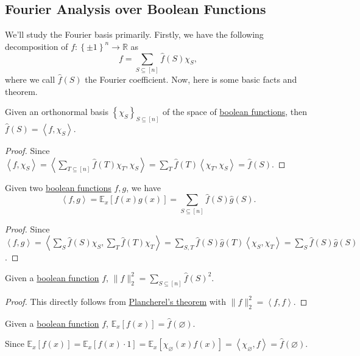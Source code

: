 \subsection{Fourier Analysis over Boolean Functions}
We'll study the Fourier basis primarily. Firstly, we have the following decomposition of \(f\colon \left\{ \pm 1 \right\} ^n \to  \mathbb{R} \) as
\[
	f = \sum_{S \subseteq [n]} \hat{f} (S) \chi _S,
\]
where we call \(\hat{f} (S)\) the Fourier coefficient. Now, here is some basic facts and theorem.

\begin{proposition}
	Given an orthonormal basis \(\left\{ \chi _S \right\}_{S\subseteq [n]} \) of the space of \hyperref[def:boolean-function]{boolean functions}, then \(\hat{f} (S) = \left\langle f, \chi _S \right\rangle \).
\end{proposition}
\begin{proof}
	Since \(\left\langle f, \chi _S \right\rangle
	= \left\langle \sum_{T \subseteq [n]} \hat{f} (T) \chi _T, \chi _S \right\rangle
	= \sum_{T} \hat{f} (T) \left\langle \chi _T, \chi _S \right\rangle
	= \hat{f} (S)\).
\end{proof}

\begin{theorem}\label{thm:Plancherel}
	Given two \hyperref[def:boolean-function]{boolean functions} \(f, g\), we have
	\[
		\left\langle f, g \right\rangle = \mathbb{E}_{x}\left[f(x)g(x) \right] = \sum_{S \subseteq [n]} \hat{f} (S) \hat{g} (S).
	\]
\end{theorem}
\begin{proof}
	Since \(\left\langle f, g \right\rangle
	= \left\langle \sum_{S} \hat{f} (S) \chi _S, \sum_{T} \hat{f} (T) \chi _T \right\rangle
	= \sum_{S, T} \hat{f} (S) \hat{g} (T) \left\langle \chi _S, \chi _T  \right\rangle
	= \sum_S \hat{f}(S)\hat{g}(S)\).
\end{proof}

\begin{theorem}\label{thm:Parseval}
	Given a \hyperref[def:boolean-function]{boolean function} \(f\), \(\lVert f \rVert _2^2 = \sum_{S \subseteq [n]} \hat{f} (S)^2\).
\end{theorem}
\begin{proof}
	This directly follows from \hyperref[thm:Plancherel]{Plancherel's theorem} with \(\lVert f \rVert _2^2 = \left\langle f, f \right\rangle \).
\end{proof}

\begin{claim}
	Given a \hyperref[def:boolean-function]{boolean function} \(f\), \(\mathbb{E}_{x}\left[f(x) \right] = \hat{f} (\varnothing )\).
\end{claim}
\begin{explanation}
	Since \(\mathbb{E}_{x}\left[f(x) \right]
	= \mathbb{E}_{x}\left[f(x) \cdot 1 \right]
	= \mathbb{E}_{x}\left[\chi _\varnothing (x) f(x) \right]
	= \left\langle \chi _\varnothing , f \right\rangle
	= \hat{f} (\varnothing )\).
\end{explanation}

